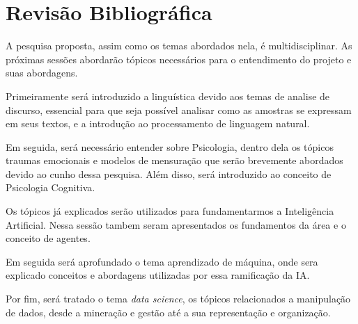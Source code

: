 \chapter{Revisão Bibliográfica}
A pesquisa proposta, assim como os temas abordados nela, é multidisciplinar. As próximas sessões abordarão tópicos necessários para o entendimento do projeto e suas abordagens.

Primeiramente será introduzido a linguística devido aos temas de analise de discurso, essencial para que seja possível analisar como as amostras se expressam em seus textos, e a introdução ao processamento de linguagem natural.

Em seguida, será necessário entender sobre Psicologia, dentro dela os tópicos traumas emocionais e modelos de mensuração que serão brevemente abordados devido ao cunho dessa pesquisa. Além disso, será introduzido ao conceito de Psicologia Cognitiva.

Os tópicos já explicados serão utilizados para fundamentarmos a Inteligência Artificial. Nessa sessão tambem seram apresentados os fundamentos da área e o conceito de agentes.

Em seguida será aprofundado o tema aprendizado de máquina, onde sera explicado conceitos e abordagens utilizadas por essa ramificação da IA.

Por fim, será tratado o tema \textit{data science}, os tópicos relacionados a manipulação de dados, desde a mineração e gestão até a sua representação e organização.






